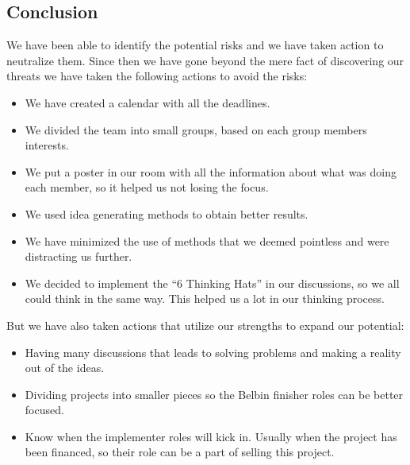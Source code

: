 \subsection{Conclusion}
We have been able to identify the potential risks and we have taken action to neutralize them. 
Since then we have gone beyond the mere fact of discovering our threats we have taken the following actions to avoid the risks:

\begin{itemize}[-]
\item We have created a calendar with all the deadlines.
\item We divided the team into small groups, based on each group members interests.
\item We put a poster in our room with all the information about what was doing each member, so it helped us not losing the focus.
\item We used idea generating methods to obtain better results.
\item We have minimized the use of methods that we deemed pointless and were distracting us further.
\item We decided to implement the ``6 Thinking Hats'' in our discussions, so we all could think in the same way. This helped us a lot in our thinking process.
\end{itemize}

But we have also taken actions that utilize our strengths to expand our potential:

\begin{itemize}[-]
\item Having many discussions that leads to solving problems and making a reality out of the ideas.
\item Dividing projects into smaller pieces so the Belbin finisher roles can be better focused. 
\item Know when the implementer roles will kick in. Usually when the project has been financed, so their role can be a part of selling this project.
\end{itemize}

